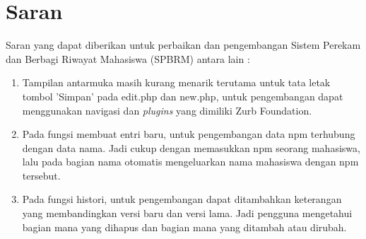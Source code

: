 \section{Saran}
\label{sec:saran}
Saran yang dapat diberikan untuk perbaikan dan pengembangan Sistem Perekam dan Berbagi Riwayat Mahasiswa (SPBRM) antara lain :
\begin{enumerate}[(1)]
  \item Tampilan antarmuka masih kurang menarik terutama untuk tata letak tombol 'Simpan' pada edit.php dan new.php, untuk pengembangan dapat menggunakan navigasi dan {\it plugins} yang dimiliki Zurb Foundation.
  \item Pada fungsi membuat entri baru, untuk pengembangan data npm terhubung dengan data nama. Jadi cukup dengan memasukkan npm seorang mahasiswa, lalu pada bagian nama otomatis mengeluarkan nama mahasiswa dengan npm tersebut.
  \item Pada fungsi histori, untuk pengembangan dapat ditambahkan keterangan yang
  membandingkan versi baru dan versi lama. Jadi pengguna mengetahui bagian mana
  yang dihapus dan bagian mana yang ditambah atau dirubah.
\end{enumerate}